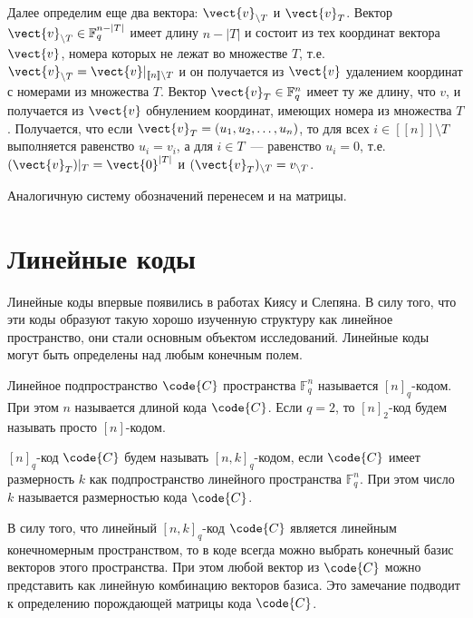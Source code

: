\documentclass[12pt]{extreport}
\begin{document}
Далее определим еще два вектора: \(\vect{v}_{\setminus T}\) и \(\vect{v}_{T}\).
Вектор \(\vect{v}_{\setminus T}\in \mathbb{F}_{q}^{n-|T|}\) имеет длину \(n-|T|\) и состоит из тех координат вектора \(\vect{v}\), номера которых не лежат во множестве \(T\), т.е. \(\vect{v}_{\setminus T}=\vect{v}\vert_{[\![n]\!]\setminus T}\) и он получается из \(\vect{v}\) удалением координат с номерами из множества \(T\).
Вектор \(\vect{v}_{T}\in\mathbb{F}_{q}^{n}\) имеет ту же длину, что \(v\), и получается из \(\vect{v}\) обнулением координат, имеющих номера из множества \(T\).
Получается, что если \(\vect{v}_{T}= \left(u_{1}, u_{2}, \dotsc, u_{n}\right)\), то для всех \(i\in [\![n]\!]\setminus T\) выполняется равенство \(u_{i}=v_{i}\), а для \(i\in T\)~--- равенство \(u_{i}=0\), т.е. \((\vect{v}_{T})\vert_{T}=\vect{0}^{|T|}\) и \((\vect{v}_{T})_{\setminus T}=v_{\setminus T}\).

Аналогичную систему обозначений перенесем и на матрицы.
\section{Линейные коды}
\label{sec:org5b347a9}
Линейные коды впервые появились в работах Киясу и Слепяна.
В силу того, что эти коды образуют такую хорошо изученную структуру как линейное пространство, они стали основным объектом исследований.
Линейные коды могут быть определены над любым конечным полем.

\begin{definition}\label{def:ncode}
Линейное подпространство \(\code{C}\) пространства \(\mathbb{F}^n_q\) называется \([n]_q\)-кодом.
При этом \(n\) называется длиной кода \(\code{C}\).
Если \(q=2\), то \([n]_2\)-код будем называть просто \([n]\)-кодом.
\end{definition}

\begin{definition}\label{def:nkcode}
\([n]_q\)-код \(\code{C}\) будем называть \([n,k]_q\)-кодом, если \(\code{C}\) имеет размерность \(k\) как подпространство линейного пространства \(\mathbb{F}^n_q\).
При этом число \(k\) называется размерностью кода \(\code{C}\).
\end{definition}

В силу того, что линейный \([n,k]_q\)-код \(\code{C}\) является линейным конечномерным пространством, то в коде всегда можно выбрать конечный базис векторов этого пространства.
При этом любой вектор из \(\code{C}\) можно представить как линейную комбинацию векторов базиса.
Это замечание подводит к определению порождающей матрицы кода \(\code{C}\).
\end{document}
